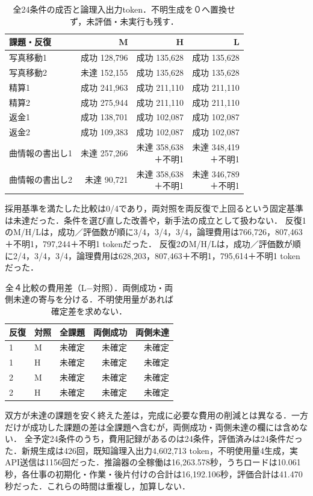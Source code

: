 \begin{table}[tb]
\centering\footnotesize\setlength{\tabcolsep}{2pt}
\caption{全24条件の成否と論理入出力token．不明生成を０へ置換せず，未評価・未実行も残す．}
\begin{tabular}{lrrr}
課題・反復 & M & H & L \\ \hline
写真移動1 & 成功 128,796 & 成功 135,628 & 成功 135,628 \\
写真移動2 & 未達 152,155 & 成功 135,628 & 成功 135,628 \\
精算1 & 成功 241,963 & 成功 211,110 & 成功 211,110 \\
精算2 & 成功 275,944 & 成功 211,110 & 成功 211,110 \\
返金1 & 成功 138,701 & 成功 102,087 & 成功 102,087 \\
返金2 & 成功 109,383 & 成功 102,087 & 成功 102,087 \\
曲情報の書出し1 & 未達 257,266 & \shortstack[r]{未達 358,638\\＋不明1} & \shortstack[r]{未達 348,419\\＋不明1} \\
曲情報の書出し2 & 未達 90,721 & \shortstack[r]{未達 358,638\\＋不明1} & \shortstack[r]{未達 346,789\\＋不明1} \\
\hline\end{tabular}
\end{table}
採用基準を満たした比較は0/4であり，両対照を両反復で上回るという固定基準は未達だった．条件を選び直した改善や，新手法の成立として扱わない．
反復1のM/H/Lは，成功／評価数が順に3/4，3/4，3/4，論理費用は766,726，807,463＋不明1，797,244＋不明1 tokenだった．
反復2のM/H/Lは，成功／評価数が順に2/4，3/4，3/4，論理費用は628,203，807,463＋不明1，795,614＋不明1 tokenだった．
\begin{table}[tb]
\centering\footnotesize\setlength{\tabcolsep}{3pt}
\caption{全４比較の費用差（L−対照）．両側成功・両側未達の寄与を分ける．不明使用量があれば確定差を求めない．}
\begin{tabular}{llrrr}
反復 & 対照 & 全課題 & 両側成功 & 両側未達 \\ \hline
1 & M & 未確定 & 未確定 & 未確定 \\
1 & H & 未確定 & 未確定 & 未確定 \\
2 & M & 未確定 & 未確定 & 未確定 \\
2 & H & 未確定 & 未確定 & 未確定 \\
\hline\end{tabular}
\end{table}
双方が未達の課題を安く終えた差は，完成に必要な費用の削減とは異なる．一方だけが成功した課題の差は全課題へ含むが，両側成功・両側未達の欄には含めない．
全予定24条件のうち，費用記録があるのは24条件，評価済みは24条件だった．新規生成は426回，既知論理入出力4,602,713 token，不明使用量4生成，実API送信は1156回だった．推論器の全稼働は16,263.578秒，うちロードは10.061秒，各仕事の初期化・作業・後片付けの合計は16,192.106秒，評価合計は41.470秒だった．これらの時間は重複し，加算しない．

